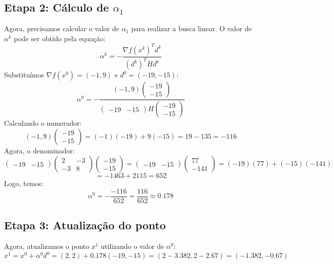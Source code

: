 \documentclass[a4paper, 12pt]{article}
\begin{document}
\subsection{Etapa 2: Cálculo de \( \alpha_1 \)}
Agora, precisamos calcular o valor de \( \alpha_1 \) para realizar a busca linear. O valor de \( \alpha^k \) pode ser obtido pela equação:
\[
\alpha^k = -\frac{\nabla f(x^k)^T d^k}{(d^k)^T H d^k}
\]
Substituímos \( \nabla f(x^0) = (-1, 9) \) e \( d^0 = (-19, -15) \):
\[
\alpha^0 = -\frac{(-1, 9) \begin{pmatrix} -19 \\ -15 \end{pmatrix}}{\begin{pmatrix} -19 & -15 \end{pmatrix} H \begin{pmatrix} -19 \\ -15 \end{pmatrix}}
\]
Calculando o numerador:
\[
(-1, 9) \begin{pmatrix} -19 \\ -15 \end{pmatrix} = (-1)(-19) + 9(-15) = 19 - 135 = -116
\]
Agora, o denominador:
\[
\begin{pmatrix} -19 & -15 \end{pmatrix} \begin{pmatrix} 2 & -3 \\ -3 & 8 \end{pmatrix} \begin{pmatrix} -19 \\ -15 \end{pmatrix} = \begin{pmatrix} -19 & -15 \end{pmatrix} \begin{pmatrix} 77 \\ -141 \end{pmatrix} = (-19)(77) + (-15)(-141)
\]
\[
= -1463 + 2115 = 652
\]
Logo, temos:
\[
\alpha^0 = -\frac{-116}{652} = \frac{116}{652} \approx 0.178
\]

\subsection{Etapa 3: Atualização do ponto}
Agora, atualizamos o ponto \( x^1 \) utilizando o valor de \( \alpha^0 \):
\[
x^1 = x^0 + \alpha^0 d^0 = (2, 2) + 0.178(-19, -15) = (2 - 3.382, 2 - 2.67) = (-1.382, -0.67)
\]
\end{document}
